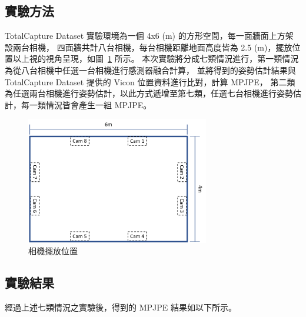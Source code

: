 \subsection{實驗方法}
TotalCapture Dataset 實驗環境為一個 4x6 (m) 的方形空間，每一面牆面上方架設兩台相機，
四面牆共計八台相機，每台相機距離地面高度皆為 2.5 (m)，擺放位置以上視的視角呈現，如圖~\ref{ch3_fig_cameraset_totalcap} 所示。
本次實驗將分成七類情況進行，第一類情況為從八台相機中任選一台相機進行感測器融合計算，
並將得到的姿勢估計結果與 TotalCapture Dataset 提供的 Vicon 位置資料進行比對，計算 MPJPE，
第二類為任選兩台相機進行姿勢估計，以此方式遞增至第七類，任選七台相機進行姿勢估計，每一類情況皆會產生一組 MPJPE。

\begin{figure}[!ht]
   \centering
   \includegraphics[width=8cm]{figure/ch3_fig_cameraset_totalcap.png}
    \caption[相機擺放位置]{相機擺放位置}
    \label{ch3_fig_cameraset_totalcap}
\end{figure}

\subsection{實驗結果}
經過上述七類情況之實驗後，得到的 MPJPE 結果如以下所示。

